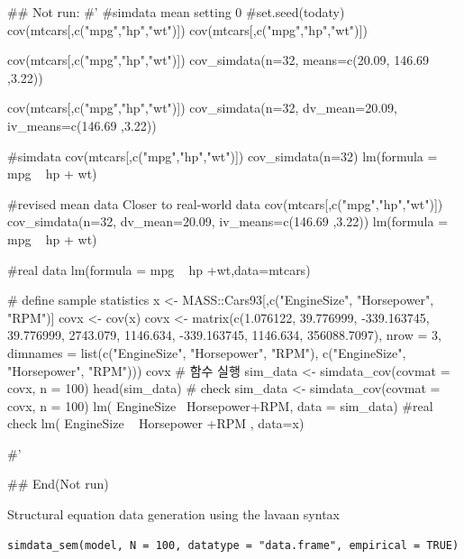 \documentclass[a4paper]{book}
\begin{document}
\begin{Examples}
\begin{ExampleCode}

\#\# Not run: 
#'
#simdata mean setting 0
#set.seed(todaty)
cov(mtcars[,c("mpg","hp","wt")]) %
cov(mtcars[,c("mpg","hp","wt")]) %

cov(mtcars[,c("mpg","hp","wt")]) %
  cov_simdata(n=32, means=c(20.09, 146.69 ,3.22))

cov(mtcars[,c("mpg","hp","wt")]) %
  cov_simdata(n=32, dv_mean=20.09, iv_means=c(146.69 ,3.22))

#simdata
cov(mtcars[,c("mpg","hp","wt")]) %
  cov_simdata(n=32) %
  lm(formula = mpg ~ hp + wt)%

#revised mean data Closer to real-world data
cov(mtcars[,c("mpg","hp","wt")]) %
  cov_simdata(n=32, dv_mean=20.09, iv_means=c(146.69 ,3.22)) %
  lm(formula = mpg ~ hp + wt)%


#real data
lm(formula = mpg ~ hp +wt,data=mtcars)%



# define sample statistics
x <- MASS::Cars93[,c("EngineSize", "Horsepower", "RPM")]
covx <- cov(x)
covx <- matrix(c(1.076122, 39.776999, -339.163745,
                 39.776999, 2743.079, 1146.634,
                 -339.163745, 1146.634, 356088.7097), nrow = 3,
               dimnames = list(c("EngineSize", "Horsepower", "RPM"),
                               c("EngineSize", "Horsepower", "RPM")))
covx
# 함수 실행
sim_data <- simdata_cov(covmat = covx, n = 100)
head(sim_data)
# check
sim_data <- simdata_cov(covmat = covx, n = 100)
lm( EngineSize~ Horsepower+RPM, data = sim_data) %
#real check
lm( EngineSize ~ Horsepower +RPM , data=x)%



#'

## End(Not run)
\end{ExampleCode}
\end{Examples}
%
\begin{Description}
Structural equation data generation using the lavaan syntax
\end{Description}
%
\begin{Usage}
\begin{verbatim}
simdata_sem(model, N = 100, datatype = "data.frame", empirical = TRUE)
\end{verbatim}
\end{Usage}
\end{document}
